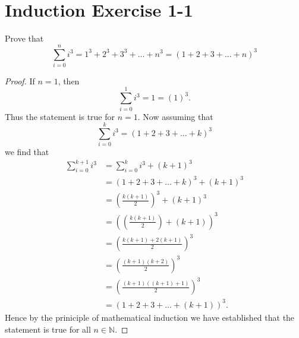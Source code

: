 \documentclass{article}
\begin{document}
\section*{Induction Exercise 1-1}
Prove that
\[
	\sum_{i=0}^{n} i^3 = 1^3 + 2^3 + 3^3 + ... + n^3 = (1+2+3+...+n)^3
\]
\begin{proof}
	If $n=1$, then
	\[
		\sum_{i=0}^{1} i^3 = 1 = (1)^3.
	\]
	Thus the statement is true for $n=1$.
	\newline\newline
	Now assuming that
	\[
		\sum_{i=0}^{k} i^3 = (1+2+3+...+k)^3
	\]
	we find that 
	\begin{align*}
		\sum_{i=0}^{k+1} i^3 & = \sum_{i=0}^{k} i^3 + (k+1)^3\\
				     & = (1+2+3+...+k)^3 + (k+1)^3 \\
				     & = \left( \frac{k(k+1)}{2} \right)^3 + (k+1)^3 \\
				     & = \left( \left( \frac{k(k+1)}{2} \right) + (k+1) \right)^3 \\
				     & = \left( \frac{k(k+1)+2(k+1)}{2} \right)^3 \\
				     & = \left( \frac{(k+1)(k+2)}{2} \right)^3 \\
				     & = \left( \frac{(k+1)((k+1)+1)}{2} \right)^3 \\
				     & = (1+2+3+...+(k+1))^3.
	\end{align*}
	Hence by the priniciple of mathematical induction we have established that the statement is true for all $n \in \mathbb{N}$.
\end{proof}
\end{document}
